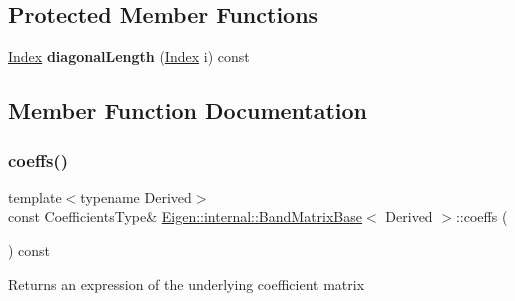 \subsection*{Protected Member Functions}
\begin{DoxyCompactItemize}
\item 
\mbox{\label{class_eigen_1_1internal_1_1_band_matrix_base_a591e1a809bd6957740356a962f922626}} 
\mbox{\hyperlink{struct_eigen_1_1_eigen_base_a554f30542cc2316add4b1ea0a492ff02}{Index}} {\bfseries diagonal\+Length} (\mbox{\hyperlink{struct_eigen_1_1_eigen_base_a554f30542cc2316add4b1ea0a492ff02}{Index}} i) const
\end{DoxyCompactItemize}


\subsection{Member Function Documentation}
\mbox{\label{class_eigen_1_1internal_1_1_band_matrix_base_ab7c9e9a7ca5ad0f2f3a82ac582650499}} 
\subsubsection{\texorpdfstring{coeffs()}{coeffs()}\hspace{0.1cm}{\footnotesize\ttfamily [1/2]}}
{\footnotesize\ttfamily template$<$typename Derived$>$ \\
const Coefficients\+Type\& \mbox{\hyperlink{class_eigen_1_1internal_1_1_band_matrix_base}{Eigen\+::internal\+::\+Band\+Matrix\+Base}}$<$ Derived $>$\+::coeffs (\begin{DoxyParamCaption}{ }\end{DoxyParamCaption}) const\hspace{0.3cm}{\ttfamily [inline]}}

\begin{DoxyReturn}{Returns}
an expression of the underlying coefficient matrix 
\end{DoxyReturn}
\mbox{\label{class_eigen_1_1internal_1_1_band_matrix_base_ab296a77fa3ac9c7618957b01c7de0a35}} 
